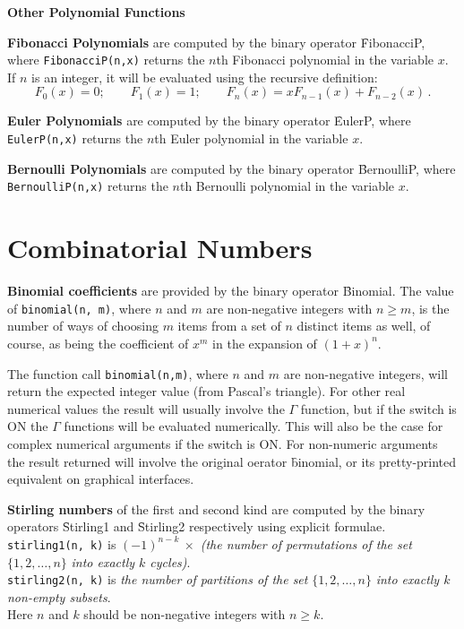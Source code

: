 \textbf{Other Polynomial Functions}
\hypertarget{operator:FIBONACCIP}{}

\textbf{Fibonacci Polynomials} are computed by the binary operator
\f{FibonacciP}, where
\texttt{FibonacciP(n,x)} returns the $n$th Fibonacci polynomial
in the variable $x$. If $n$ is an integer, it will be
evaluated using the recursive definition:
\[F_0(x) = 0;\qquad F_1(x) = 1; \qquad F_n(x) = x F_{n-1}(x) + F_{n-2}(x)\,.\]

\textbf{Euler Polynomials} are computed by the binary operator
\f{EulerP}, where\linebreak
\texttt{EulerP(n,x)} returns the $n$th Euler polynomial in the variable $x$.

\textbf{Bernoulli Polynomials} are computed by the binary operator
\f{BernoulliP}, where \texttt{BernoulliP(n,x)} returns the
$n$th Bernoulli polynomial in the variable $x$.

\section{Combinatorial Numbers}
  
\textbf{Binomial coefficients} are provided by the binary operator \f{Binomial}.
The value of \texttt{binomial(n, m)}, where $n$ and $m$ are non-negative
integers with $n \geq m$, is the number of ways of choosing $m$ items from a
set of $n$ distinct items as well, of course, as being the coefficient of $x^m$
in the expansion of $(1+x)^n$.

The function call \texttt{binomial(n,m)}, where $n$ and $m$
are non-negative integers, will return the expected integer value
(from Pascal's triangle). For other real numerical values the result will
usually involve the $\Gamma$ function, but if the switch
 is ON the $\Gamma$ functions will be evaluated numerically.
This will also be the case for complex numerical arguments if the switch
 is ON.  For non-numeric arguments the result returned will
involve the original oerator \f{binomial}, or its pretty-printed equivalent
on graphical interfaces.

\hypertarget{operator:Stirling1}{}\hypertarget{operator:Stirling2}{}
\textbf{Stirling numbers} of the first and second kind are computed
by the binary operators \f{Stirling1} and \f{Stirling2}
respectively using explicit formulae.
\texttt{stirling1(n, k)} is $(-1)^{n-k}\ \times$
\emph{(the number of permutations of the set} $\{1, 2, \ldots, n\}$
\emph{into exactly $k$ cycles)}.\\
\texttt{stirling2(n, k)} is \emph{the number of partitions of the set}
$\{1, 2, \ldots, n\}$ \emph{into exactly $k$ non-empty subsets}.\\
Here $n$ and $k$ should be non-negative integers with $n \geq k$.


